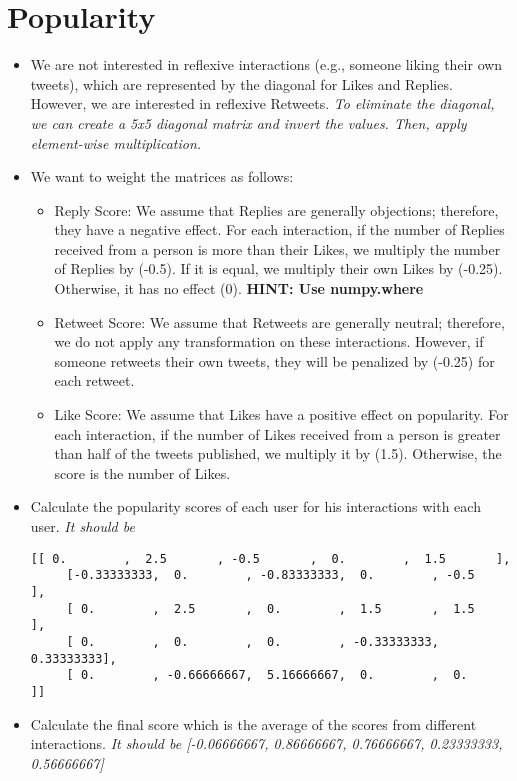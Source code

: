 \documentclass[11pt, a4paper]{article}
\newcommand{\cmt}[1]{\textit{\color{red}#1}}
\begin{document}
\section*{Popularity}

\begin{itemize}
	\item We are not interested in reflexive interactions (e.g., someone liking their own tweets), which are represented by the diagonal for Likes and Replies. However, we are interested in reflexive Retweets.
	\textit{To eliminate the diagonal, we can create a 5x5 diagonal matrix and invert the values. Then, apply element-wise multiplication.}
	\item We want to weight the matrices as follows:
	\begin{itemize}
		\item Reply Score: We assume that Replies are generally objections; therefore, they have a negative effect. For each interaction, if the number of Replies received from a person is more than their Likes, we multiply the number of Replies by (-0.5). If it is equal, we multiply their own Likes by (-0.25). Otherwise, it has no effect (0). \textbf{HINT: Use numpy.where}
		\item Retweet Score: We assume that Retweets are generally neutral; therefore, we do not apply any transformation on these interactions. However, if someone retweets their own tweets, they will be penalized by (-0.25) for each retweet.
		\item Like Score: We assume that Likes have a positive effect on popularity. For each interaction, if the number of Likes received from a person is greater than half of the tweets published, we multiply it by (1.5). Otherwise, the score is the number of Likes.
	\end{itemize}
	\item Calculate the popularity scores of each user for his interactions with each user.
	\cmt{It should be}
	\begin{Verbatim}[fontsize=\small, formatcom=\color{red}]
	[[ 0.        ,  2.5       , -0.5       ,  0.        ,  1.5       ],
	 [-0.33333333,  0.        , -0.83333333,  0.        , -0.5       ],
	 [ 0.        ,  2.5       ,  0.        ,  1.5       ,  1.5       ],
	 [ 0.        ,  0.        ,  0.        , -0.33333333,  0.33333333],
	 [ 0.        , -0.66666667,  5.16666667,  0.        ,  0.        ]]
	\end{Verbatim}
	\item Calculate the final score which is the average of the scores from different interactions.
	\cmt{It should be [-0.06666667,  0.86666667,  0.76666667,  0.23333333,  0.56666667]}
\end{itemize}
\end{document}
